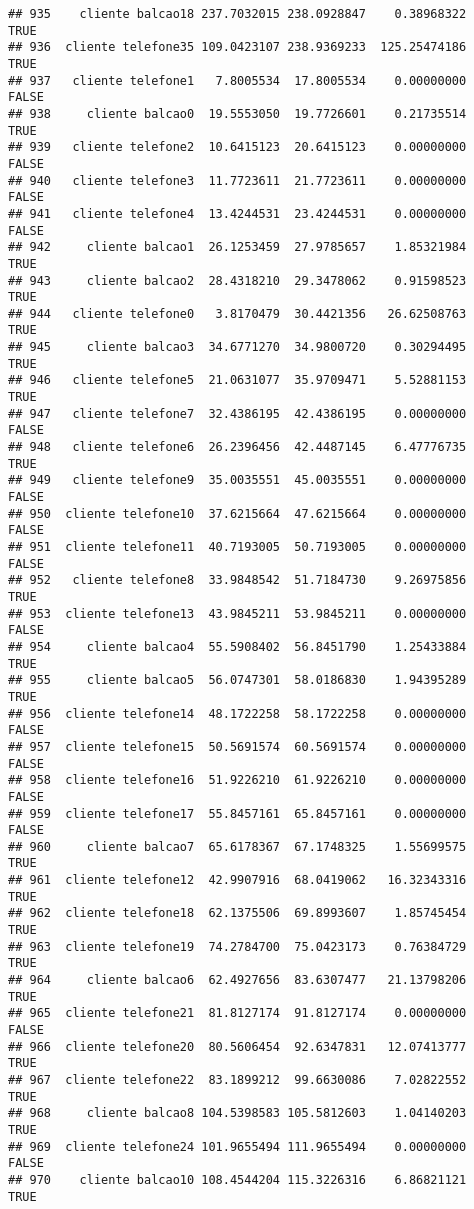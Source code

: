 \documentclass[
]{article}
\begin{document}
\begin{verbatim}
## 935    cliente balcao18 237.7032015 238.0928847    0.38968322     TRUE
## 936  cliente telefone35 109.0423107 238.9369233  125.25474186     TRUE
## 937   cliente telefone1   7.8005534  17.8005534    0.00000000    FALSE
## 938     cliente balcao0  19.5553050  19.7726601    0.21735514     TRUE
## 939   cliente telefone2  10.6415123  20.6415123    0.00000000    FALSE
## 940   cliente telefone3  11.7723611  21.7723611    0.00000000    FALSE
## 941   cliente telefone4  13.4244531  23.4244531    0.00000000    FALSE
## 942     cliente balcao1  26.1253459  27.9785657    1.85321984     TRUE
## 943     cliente balcao2  28.4318210  29.3478062    0.91598523     TRUE
## 944   cliente telefone0   3.8170479  30.4421356   26.62508763     TRUE
## 945     cliente balcao3  34.6771270  34.9800720    0.30294495     TRUE
## 946   cliente telefone5  21.0631077  35.9709471    5.52881153     TRUE
## 947   cliente telefone7  32.4386195  42.4386195    0.00000000    FALSE
## 948   cliente telefone6  26.2396456  42.4487145    6.47776735     TRUE
## 949   cliente telefone9  35.0035551  45.0035551    0.00000000    FALSE
## 950  cliente telefone10  37.6215664  47.6215664    0.00000000    FALSE
## 951  cliente telefone11  40.7193005  50.7193005    0.00000000    FALSE
## 952   cliente telefone8  33.9848542  51.7184730    9.26975856     TRUE
## 953  cliente telefone13  43.9845211  53.9845211    0.00000000    FALSE
## 954     cliente balcao4  55.5908402  56.8451790    1.25433884     TRUE
## 955     cliente balcao5  56.0747301  58.0186830    1.94395289     TRUE
## 956  cliente telefone14  48.1722258  58.1722258    0.00000000    FALSE
## 957  cliente telefone15  50.5691574  60.5691574    0.00000000    FALSE
## 958  cliente telefone16  51.9226210  61.9226210    0.00000000    FALSE
## 959  cliente telefone17  55.8457161  65.8457161    0.00000000    FALSE
## 960     cliente balcao7  65.6178367  67.1748325    1.55699575     TRUE
## 961  cliente telefone12  42.9907916  68.0419062   16.32343316     TRUE
## 962  cliente telefone18  62.1375506  69.8993607    1.85745454     TRUE
## 963  cliente telefone19  74.2784700  75.0423173    0.76384729     TRUE
## 964     cliente balcao6  62.4927656  83.6307477   21.13798206     TRUE
## 965  cliente telefone21  81.8127174  91.8127174    0.00000000    FALSE
## 966  cliente telefone20  80.5606454  92.6347831   12.07413777     TRUE
## 967  cliente telefone22  83.1899212  99.6630086    7.02822552     TRUE
## 968     cliente balcao8 104.5398583 105.5812603    1.04140203     TRUE
## 969  cliente telefone24 101.9655494 111.9655494    0.00000000    FALSE
## 970    cliente balcao10 108.4544204 115.3226316    6.86821121     TRUE

\end{verbatim}
\end{document}

